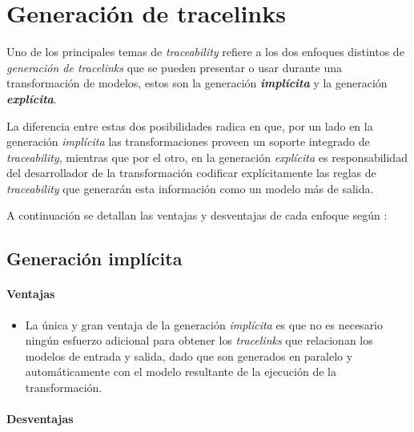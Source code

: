 \documentclass[a4paper,12pt,oneside,spanish]{book}
\begin{document}
\section{Generación de tracelinks}
\label{sec:GeneracionTracelinks}

Uno de los principales temas de \textit{traceability} refiere a los dos enfoques distintos de \textit{generación de tracelinks} que se pueden presentar o usar durante una transformación de modelos, estos son la generación \textit{\textbf{implícita}} y la generación \textit{\textbf{explícita}}. 

La diferencia entre estas dos posibilidades radica en que, por un lado en la generación \textit{implícita} las transformaciones proveen un soporte integrado de \textit{traceability}, mientras que por el otro, en la generación \textit{explícita} es responsabilidad del desarrollador de la transformación codificar explícitamente las reglas de \textit{traceability} que generarán esta información como un modelo más de salida.

A continuación se detallan las ventajas y desventajas de cada enfoque según \cite{GrammelVoigt}:


\subsection{Generación implícita}

\paragraph{Ventajas}

\begin{itemize}[label={\checkmark}]

\item La única y gran ventaja de la generación \textit{implícita} es que no es necesario ningún esfuerzo adicional para obtener los \textit{tracelinks} que relacionan los modelos de entrada y salida, dado que son generados en paralelo y automáticamente con el modelo resultante de la ejecución de la transformación.

\end{itemize}

\paragraph{Desventajas}
\end{document}
